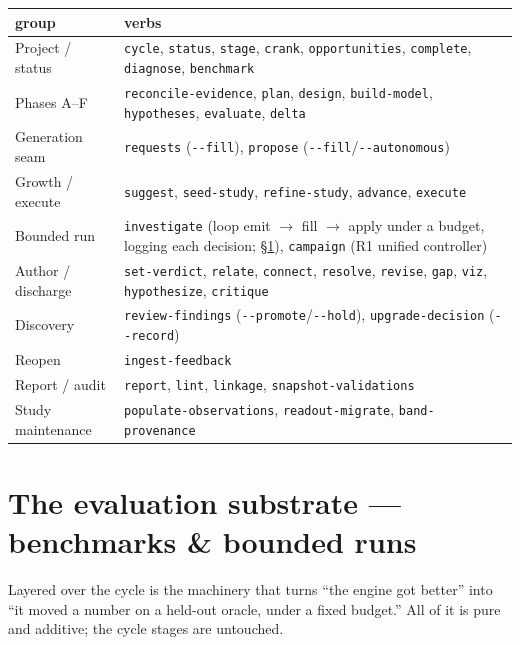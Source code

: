 \documentclass[11pt]{article}
\newcommand{\code}[1]{\texttt{\small #1}}
\begin{document}
\begin{center}\small
\begin{tabularx}{\textwidth}{@{}l Y@{}}
\toprule
\textbf{group} & \textbf{verbs}\\
\midrule
Project / status & \code{cycle}, \code{status}, \code{stage}, \code{crank}, \code{opportunities}, \code{complete}, \code{diagnose}, \code{benchmark}\\
Phases A--F & \code{reconcile-evidence}, \code{plan}, \code{design}, \code{build-model}, \code{hypotheses}, \code{evaluate}, \code{delta}\\
Generation seam & \code{requests} (\code{-{}-fill}), \code{propose} (\code{-{}-fill}/\code{-{}-autonomous})\\
Growth / execute & \code{suggest}, \code{seed-study}, \code{refine-study}, \code{advance}, \code{execute}\\
Bounded run & \code{investigate} (loop emit $\rightarrow$ fill $\rightarrow$ apply under a budget, logging each decision; \S\ref{sec:eval}), \code{campaign} (R1 unified controller)\\
Author / discharge & \code{set-verdict}, \code{relate}, \code{connect}, \code{resolve}, \code{revise}, \code{gap}, \code{viz}, \code{hypothesize}, \code{critique}\\
Discovery & \code{review-findings} (\code{-{}-promote}/\code{-{}-hold}), \code{upgrade-decision} (\code{-{}-record})\\
Reopen & \code{ingest-feedback}\\
Report / audit & \code{report}, \code{lint}, \code{linkage}, \code{snapshot-validations}\\
Study maintenance & \code{populate-observations}, \code{readout-migrate}, \code{band-provenance}\\
\bottomrule
\end{tabularx}
\end{center}

\section{The evaluation substrate --- benchmarks \& bounded runs}\label{sec:eval}

Layered over the cycle is the machinery that turns ``the engine got better'' into ``it moved a
number on a held-out oracle, under a fixed budget.'' All of it is pure and additive; the cycle
stages are untouched.
\end{document}
